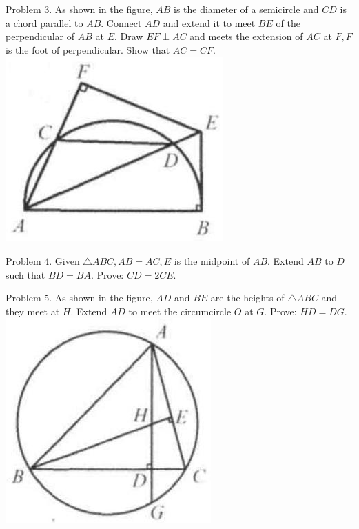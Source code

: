 \documentclass[10pt]{article}
\begin{document}
Problem 3. As shown in the figure, \(A B\) is the diameter of a semicircle and \(C D\) is a chord parallel to \(A B\). Connect \(A D\) and extend it to meet \(B E\) of the perpendicular of \(A B\) at \(E\). Draw \(E F \perp A C\) and meets the extension of \(A C\) at \(F, F\) is the foot of perpendicular. Show that \(A C=C F\).\\
\includegraphics[max width=\textwidth, center]{2025_04_17_97bc1f7e44d93c271a88g-206(1)}

Problem 4. Given \(\triangle A B C, A B=A C, E\) is the midpoint of \(A B\). Extend \(A B\) to \(D\) such that \(B D=B A\). Prove: \(C D=2 C E\).

Problem 5. As shown in the figure, \(A D\) and \(B E\) are the heights of \(\triangle A B C\) and they meet at \(H\). Extend \(A D\) to meet the circumcircle \(O\) at \(G\). Prove: \(H D=D G\).\\
\includegraphics[max width=\textwidth, center]{2025_04_17_97bc1f7e44d93c271a88g-206}
\end{document}
